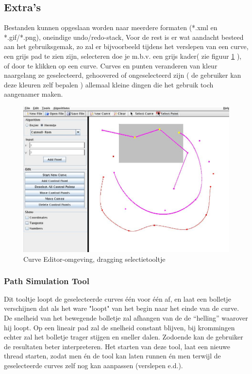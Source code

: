 \documentclass[a4paper,11pt,oneside, titlepage]{article}
\begin{document}
\subsection{Extra's}
Bestanden kunnen opgeslaan worden naar meerdere formaten (*.xml en *.gif/*.png), oneindige undo/redo-stack, Voor de rest is er wat aandacht besteed aan het gebruiksgemak, zo zal er bijvoorbeeld tijdens het verslepen van een curve, een grijs pad te zien zijn, selecteren doe je m.b.v. een grijs kader( zie figuur \ref{scrSel} ), of door te klikken op een curve. Curves en punten veranderen van kleur naargelang ze geselecteerd, gehoovered of ongeselecteerd zijn ( de gebruiker kan deze kleuren zelf bepalen ) allemaal kleine dingen die het gebruik toch aangenamer maken.
\begin{figure}[htbp]
\centering
\includegraphics[scale=0.4]{./screenies/selectPoint.jpg}
\caption{Curve Editor-omgeving, dragging selectietooltje}\label{scrSel}
\end{figure}
\subsubsection{Path Simulation Tool}
Dit tooltje loopt de geselecteerde curves \'e\'en voor \'e\'en af, en laat een bolletje verschijnen dat als het ware "loopt" van het begin naar het einde van de curve. 
De snelheid van het bewegende bolletje zal afhangen van de de ``helling'' waarover hij loopt.
Op een lineair pad zal de snelheid constant blijven, bij krommingen echter zal het bolletje
trager stijgen en sneller dalen. Zodoende kan de gebruiker de resultaten beter interpreteren.
Het starten van deze tool, laat een nieuwe thread starten, zodat men \'en de tool kan laten runnen \'en men terwijl de geselecteerde curves zelf nog kan aanpassen (verslepen e.d.). 
\end{document}
